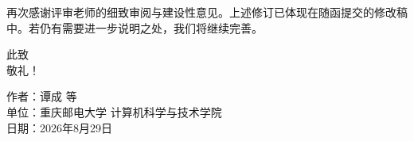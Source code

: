 \documentclass[11pt,a4paper]{ctexart}
\begin{document}
\vspace{1.5em}
\noindent 再次感谢评审老师的细致审阅与建设性意见。上述修订已体现在随函提交的修改稿中。若仍有需要进一步说明之处，我们将继续完善。

\vspace{2em}
\noindent 此致\\
敬礼！

\vspace{1em}
\noindent 作者：谭成 等\\
\noindent 单位：重庆邮电大学 计算机科学与技术学院\\
\noindent 日期：2026年8月29日
\end{document}
